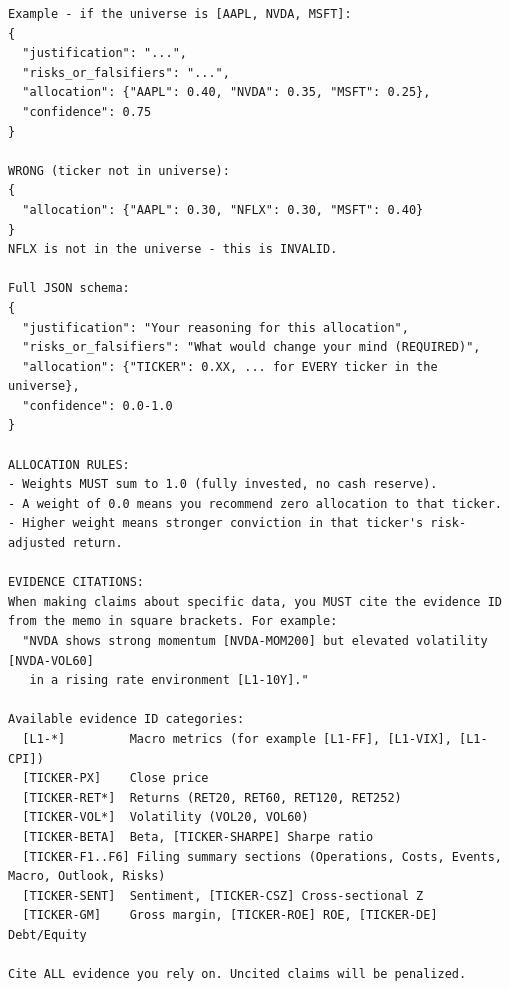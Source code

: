 \documentclass{article}
\begin{document}
\begin{lstlisting}
Example - if the universe is [AAPL, NVDA, MSFT]:
{
  "justification": "...",
  "risks_or_falsifiers": "...",
  "allocation": {"AAPL": 0.40, "NVDA": 0.35, "MSFT": 0.25},
  "confidence": 0.75
}

WRONG (ticker not in universe):
{
  "allocation": {"AAPL": 0.30, "NFLX": 0.30, "MSFT": 0.40}
}
NFLX is not in the universe - this is INVALID.

Full JSON schema:
{
  "justification": "Your reasoning for this allocation",
  "risks_or_falsifiers": "What would change your mind (REQUIRED)",
  "allocation": {"TICKER": 0.XX, ... for EVERY ticker in the universe},
  "confidence": 0.0-1.0
}

ALLOCATION RULES:
- Weights MUST sum to 1.0 (fully invested, no cash reserve).
- A weight of 0.0 means you recommend zero allocation to that ticker.
- Higher weight means stronger conviction in that ticker's risk-adjusted return.

EVIDENCE CITATIONS:
When making claims about specific data, you MUST cite the evidence ID
from the memo in square brackets. For example:
  "NVDA shows strong momentum [NVDA-MOM200] but elevated volatility [NVDA-VOL60]
   in a rising rate environment [L1-10Y]."

Available evidence ID categories:
  [L1-*]         Macro metrics (for example [L1-FF], [L1-VIX], [L1-CPI])
  [TICKER-PX]    Close price
  [TICKER-RET*]  Returns (RET20, RET60, RET120, RET252)
  [TICKER-VOL*]  Volatility (VOL20, VOL60)
  [TICKER-BETA]  Beta, [TICKER-SHARPE] Sharpe ratio
  [TICKER-F1..F6] Filing summary sections (Operations, Costs, Events, Macro, Outlook, Risks)
  [TICKER-SENT]  Sentiment, [TICKER-CSZ] Cross-sectional Z
  [TICKER-GM]    Gross margin, [TICKER-ROE] ROE, [TICKER-DE] Debt/Equity

Cite ALL evidence you rely on. Uncited claims will be penalized.
\end{lstlisting}
\end{document}
